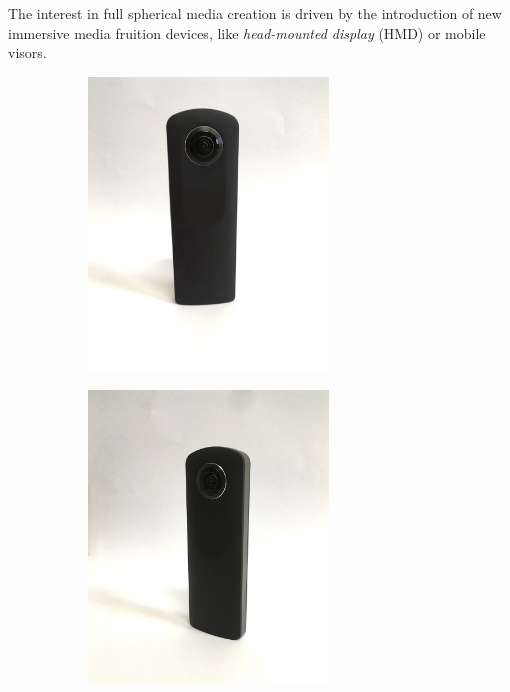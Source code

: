 The interest in full spherical media creation is driven by the introduction 
of  new immersive media fruition devices, like 
\textit{head-mounted display} (HMD) or mobile visors.
\begin{figure}
	\centering
	\begin{subfigure}{0.3\textwidth}
		\centering
		\includegraphics[width=0.7\textwidth]{img/theta1}
	\end{subfigure}
	\begin{subfigure}{0.3\textwidth}
		\centering
		\includegraphics[width=0.7\textwidth]{img/theta2}

\end{subfigure}
\end{figure}
